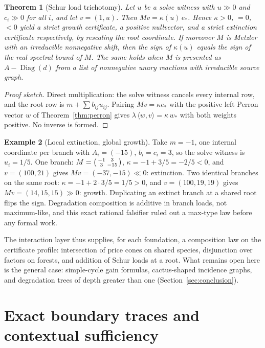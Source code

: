 \documentclass[11pt,a4paper]{article}
\theoremstyle{plain}
\newtheorem{theorem}{Theorem}[section]
\theoremstyle{definition}
\newtheorem{example}[theorem]{Example}
\theoremstyle{remark}
\newcommand{\Diag}{\operatorname{Diag}}
\begin{document}
\begin{theorem}[Schur load trichotomy]\label{thm:star}
Let $u$ be a solve witness with $u\gg 0$ and $c_i\gg 0$ for all $i$, and let $v=(1,u)$. Then $Mv=\kappa(u)\,e_\ast$. Hence $\kappa>0$, $=0$, $<0$ yield a strict growth certificate, a positive nullvector, and a strict extinction certificate respectively, by rescaling the root coordinate. If moreover $M$ is Metzler with an irreducible nonnegative shift, then the sign of $\kappa(u)$ \emph{equals} the sign of the real spectral bound of $M$. The same holds when $M$ is presented as $A-\Diag(d)$ from a list of nonnegative unary reactions with irreducible source graph.
\end{theorem}
\begin{proof}[Proof sketch]
Direct multiplication: the solve witness cancels every internal row, and the root row is $m+\sum b_{ij}u_{ij}$. Pairing $Mv=\kappa e_\ast$ with the positive left Perron vector $w$ of Theorem~\ref{thm:perron} gives $\lambda\,\langle w,v\rangle=\kappa\,w_\ast$ with both weights positive. No inverse is formed.
\end{proof}

\begin{example}[Local extinction, global growth]\label{ex:star}
Take $m=-1$, one internal coordinate per branch with $A_i=(-15)$, $b_i=c_i=3$, so the solve witness is $u_i=1/5$. One branch: $M=\begin{psmallmatrix}-1&3\\3&-15\end{psmallmatrix}$, $\kappa=-1+3/5=-2/5<0$, and $v=(100,21)$ gives $Mv=(-37,-15)\ll 0$: extinction. Two identical branches on the same root: $\kappa=-1+2\cdot 3/5=1/5>0$, and $v=(100,19,19)$ gives $Mv=(14,15,15)\gg 0$: growth. Duplicating an extinct branch at a shared root flips the sign. Degradation composition is additive in branch loads, not maximum-like, and this exact rational falsifier ruled out a max-type law before any formal work.
\end{example}

The interaction layer thus supplies, for each foundation, a composition law on the certificate profile: intersection of price cones on shared species, disjunction over factors on forests, and addition of Schur loads at a root. What remains open here is the general case: simple-cycle gain formulas, cactus-shaped incidence graphs, and degradation trees of depth greater than one (Section~\ref{sec:conclusion}).

\section{Exact boundary traces and contextual sufficiency}\label{sec:trace}
\end{document}
